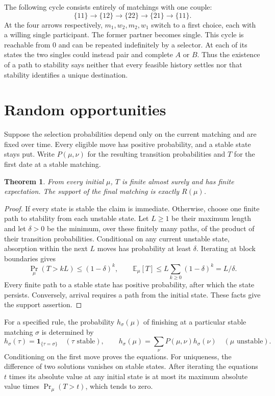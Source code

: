 \documentclass[11pt]{article}
\newtheorem{theorem}{Theorem}
\begin{document}
The following cycle consists entirely of matchings with one couple:
\[
 \{11\}\longrightarrow\{12\}\longrightarrow\{22\}
 \longrightarrow\{21\}\longrightarrow\{11\}.
\]
At the four arrows respectively, \(m_1,w_2,m_2,w_1\) switch to a first choice, each with a willing single participant. The former partner becomes single. This cycle is reachable from \(0\) and can be repeated indefinitely by a selector. At each of its states the two singles could instead pair and complete \(A\) or \(B\). Thus the existence of a path to stability says neither that every feasible history settles nor that stability identifies a unique destination.

\section{Random opportunities}

Suppose the selection probabilities depend only on the current matching and are fixed over time. Every eligible move has positive probability, and a stable state stays put. Write \(P(\mu,\nu)\) for the resulting transition probabilities and \(T\) for the first date at a stable matching.

\begin{theorem}
From every initial \(\mu\), \(T\) is finite almost surely and has finite expectation. The support of the final matching is exactly \(R(\mu)\).
\end{theorem}

\begin{proof}
If every state is stable the claim is immediate. Otherwise, choose one finite path to stability from each unstable state. Let \(L\geq1\) be their maximum length and let \(\delta>0\) be the minimum, over these finitely many paths, of the product of their transition probabilities. Conditional on any current unstable state, absorption within the next \(L\) moves has probability at least \(\delta\). Iterating at block boundaries gives
\[
 \Pr_\mu(T>kL)\leq(1-\delta)^k,\qquad
 \mathbb E_\mu[T]\leq L\sum_{k\geq0}(1-\delta)^k=L/\delta .
\]
Every finite path to a stable state has positive probability, after which the state persists. Conversely, arrival requires a path from the initial state. These facts give the support assertion.
\end{proof}

For a specified rule, the probability \(h_\sigma(\mu)\) of finishing at a particular stable matching \(\sigma\) is determined by
\[
 h_\sigma(\tau)=\mathbf{1}_{\{\tau=\sigma\}}\quad(\tau\text{ stable}),
 \qquad
 h_\sigma(\mu)=\sum_{\nu}P(\mu,\nu)h_\sigma(\nu)
                       \quad(\mu\text{ unstable}).
\]
Conditioning on the first move proves the equations. For uniqueness, the difference of two solutions vanishes on stable states. After iterating the equations \(t\) times its absolute value at any initial state is at most its maximum absolute value times \(\Pr_\mu(T>t)\), which tends to zero.
\end{document}
